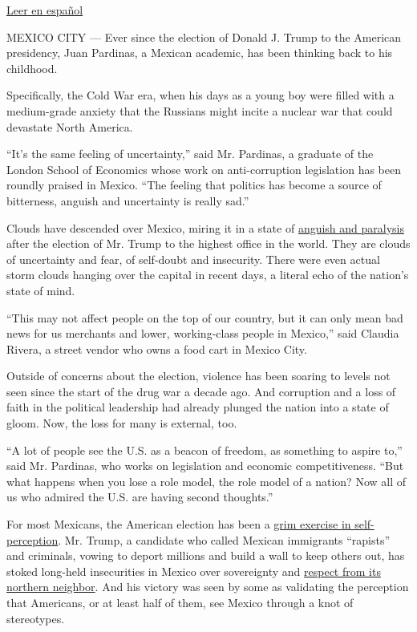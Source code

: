 \href{http://www.nytimes.com/es/2016/11/15/despues-de-la-victoria-de-trump-mexico-se-pregunta-ahora-que/}{Leer
en español}

MEXICO CITY --- Ever since the election of Donald J. Trump to the
American presidency, Juan Pardinas, a Mexican academic, has been
thinking back to his childhood.

Specifically, the Cold War era, when his days as a young boy were filled
with a medium-grade anxiety that the Russians might incite a nuclear war
that could devastate North America.

``It's the same feeling of uncertainty,'' said Mr. Pardinas, a graduate
of the London School of Economics whose work on anti-corruption
legislation has been roundly praised in Mexico. ``The feeling that
politics has become a source of bitterness, anguish and uncertainty is
really sad.''

Clouds have descended over Mexico, miring it in a state of
\href{http://www.nytimes.com/2016/11/10/world/americas/mexico-donald-trump-peso.html}{anguish
and paralysis} after the election of Mr. Trump to the highest office in
the world. They are clouds of uncertainty and fear, of self-doubt and
insecurity. There were even actual storm clouds hanging over the capital
in recent days, a literal echo of the nation's state of mind.

``This may not affect people on the top of our country, but it can only
mean bad news for us merchants and lower, working-class people in
Mexico,'' said Claudia Rivera, a street vendor who owns a food cart in
Mexico City.

Outside of concerns about the election, violence has been soaring to
levels not seen since the start of the drug war a decade ago. And
corruption and a loss of faith in the political leadership had already
plunged the nation into a state of gloom. Now, the loss for many is
external, too.

``A lot of people see the U.S. as a beacon of freedom, as something to
aspire to,'' said Mr. Pardinas, who works on legislation and economic
competitiveness. ``But what happens when you lose a role model, the role
model of a nation? Now all of us who admired the U.S. are having second
thoughts.''

For most Mexicans, the American election has been a
\href{http://www.nytimes.com/2016/05/23/world/americas/donald-trump-mexico.html}{grim
exercise in self-perception}. Mr. Trump, a candidate who called Mexican
immigrants ``rapists'' and criminals, vowing to deport millions and
build a wall to keep others out, has stoked long-held insecurities in
Mexico over sovereignty and
\href{http://www.nytimes.com/2016/09/01/world/americas/trump-mexico-pena-nieto-reaction.html}{respect
from its northern neighbor}. And his victory was seen by some as
validating the perception that Americans, or at least half of them, see
Mexico through a knot of stereotypes.

